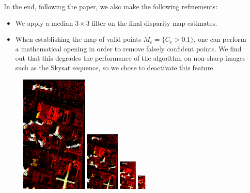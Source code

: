\documentclass{article}
\theoremstyle{definition}
\begin{document}
In the end, following the paper, we also make the following refinements:
\begin{itemize}
 \item We apply a median $3\times 3$ filter on the final disparity map estimates.
 \item When establishing the map of valid points $M_e = \{C_e > 0.1\}$, one can perform a mathematical opening in order to remove falsely confident points. We find out that this degrades the performance of the algorithm on non-sharp images such as the Skysat sequence, so we chose to deactivate this feature.
\end{itemize}


\begin{figure}[ht]
  \centering
  \includegraphics[width=0.3\textwidth]{animate_skysat_ftc4/pyr/1521568225606_pyr_depth_000.png}
  \includegraphics[width=0.15\textwidth]{animate_skysat_ftc4/pyr/1521568225606_pyr_depth_001.png}
  \includegraphics[width=0.075\textwidth]{animate_skysat_ftc4/pyr/1521568225606_pyr_depth_002.png}
  \includegraphics[width=0.0375\textwidth]{animate_skysat_ftc4/pyr/1521568225606_pyr_depth_003.png}

\end{figure}
\end{document}
